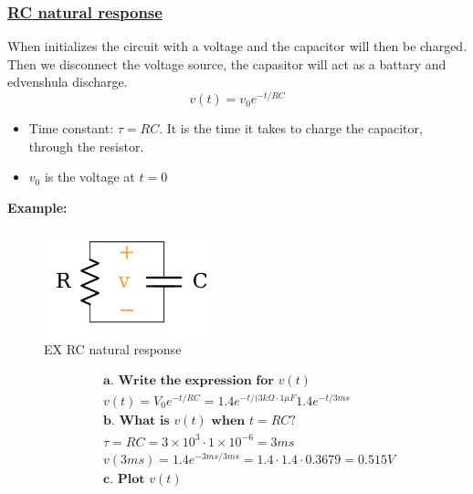 \subsubsection{\href{https://www.khanacademy.org/science/electrical-engineering/ee-circuit-analysis-topic/ee-natural-and-forced-response/a/ee-rc-natural-response}{RC natural response}}
When initializes the circuit with a voltage and the capacitor will then be charged. Then we disconnect
the voltage source, the capasitor will act as a battary and edvenshula discharge. 
\begin{equation}
  v(t)=v_0e^{-t/RC}
\end{equation}
\begin{itemize}
    \item Time constant: $\tau=RC$. It is the time it takes to charge the capacitor, through the resistor.
    \item $v_0$ is the voltage at $t=0$
\end{itemize}

\textbf{Example:}
\begin{figure}[h]
    \centering
    \includegraphics[width=5cm]{image/ex_RC_natural_response.png}
    \caption{EX RC natural response}
\end{figure}

\begin{align*}
  &\quad  \textbf{a. Write the expression for } v(t) \\
  &\quad  v(t) = V_0e^{-t/RC} = 1.4e^{-t/(3k\Omega\cdot{1\mu{F}}} 1.4e^{-t/3ms} \\
  &\quad  \textbf{b. What is $v(t)$ when $t=RC$?} \\
  &\quad  \tau=RC=3\times10^3\cdot{1\times10^{-6}} = 3ms \\
  &\quad  v(3ms) = 1.4e^{-3ms/3ms} = 1.4\cdot{1.4\cdot{0.3679}} = 0.515V \\
  &\quad  \textbf{c. Plot } v(t) \\
\end{align*}

